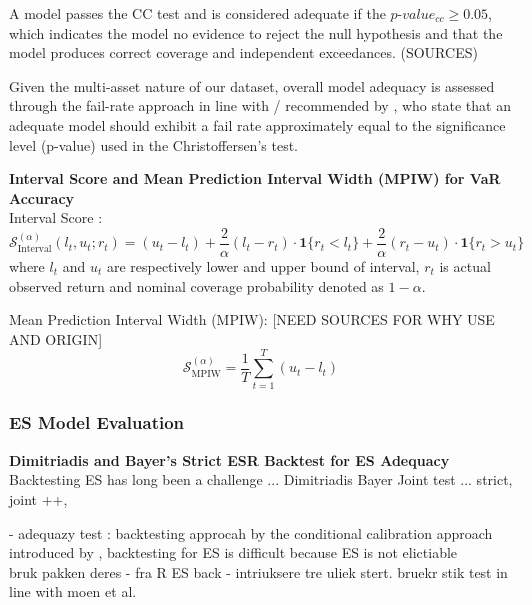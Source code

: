 A model passes the CC test and is considered adequate if the $p\text{-}value_{cc} \geq 0.05$, which indicates the model no evidence to reject the null hypothesis and that the model produces correct coverage and independent exceedances. (SOURCES) 

Given the multi-asset nature of our dataset, overall model adequacy is assessed through the fail-rate approach in line with / recommended by \textcite{Bayer2020}, who state that an adequate model should exhibit a fail rate approximately equal to the significance level (p-value) used in the Christoffersen's test.

\textbf{Interval Score and Mean Prediction Interval Width (MPIW) for VaR Accuracy} \\

Interval Score \parencite{gneiting2007}: 
\begin{equation}
\mathcal{S}_{\text{Interval}}^{(\alpha)}(l_t, u_t; r_t) =
(u_t - l_t) 
+ \frac{2}{\alpha} (l_t - r_t) \cdot \mathbf{1}\{r_t < l_t\} 
+ \frac{2}{\alpha} (r_t - u_t) \cdot \mathbf{1}\{r_t > u_t\}
\end{equation}
where $l_t$ and $u_t$ are respectively lower and upper bound of interval, $r_t$ is actual observed return and nominal coverage probability denoted as $1-\alpha$. 

Mean Prediction Interval Width (MPIW): [NEED SOURCES FOR WHY USE AND ORIGIN]
\begin{equation}
\mathcal{S}_{\text{MPIW}}^{(\alpha)} = \frac{1}{T} \sum_{t=1}^{T} (u_t - l_t)
\end{equation}




\subsubsection{ES Model Evaluation}



\textbf{Dimitriadis and Bayer's Strict ESR Backtest for ES Adequacy}\\

Backtesting ES has long been a challenge ... Dimitriadis Bayer Joint test ... strict, joint ++, 

- adequazy test : backtesting approcah by the conditional calibration approach introduced by \parencite{Bayer2020}, backtesting for ES is difficult because ES is not elictiable \\

bruk pakken deres - fra R ES back - intriuksere tre uliek stert. bruekr stik test in line with moen et al. 


